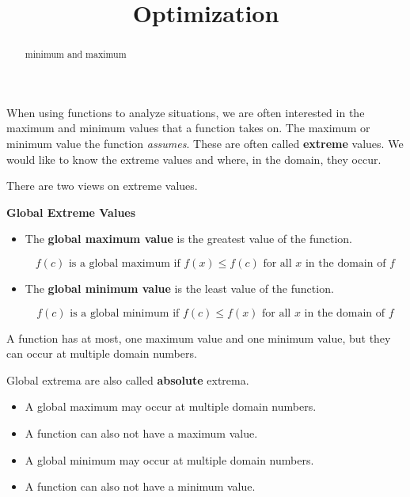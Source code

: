 \documentclass{ximera}
\title{Optimization}
\begin{document}
\begin{abstract}
minimum and maximum
\end{abstract}
\maketitle



When using functions to analyze situations, we are often interested in the maximum and minimum values that a function takes on. The maximum or minimum value the function \textit{assumes}. These are often called \textbf{extreme} values. We would like to know the extreme values and where, in the domain, they occur.



There are two views on extreme values.

\begin{definition} \textbf{\textcolor{green!50!black}{Global Extreme Values}} 

\begin{itemize}
\item The \textbf{global maximum value} is the greatest value of the function.  

\[  f(c) \text{ is a global maximum if } f(x) \leq f(c) \text{ for all } x \text{ in the domain of } f \]

\item The \textbf{global minimum value} is the least value of the function.  

\[  f(c) \text{ is a global minimum if } f(c) \leq f(x) \text{ for all } x \text{ in the domain of } f \]
\end{itemize}

A function has at most, one maximum value and one minimum value, but they can occur at multiple domain numbers.

Global extrema are also called \textbf{absolute} extrema.

\end{definition}




\begin{warning}

\begin{itemize}
\item A global maximum may occur at multiple domain numbers.  
\item A function can also not have a maximum value.
\end{itemize}

\begin{itemize}
\item A global minimum may occur at multiple domain numbers.  
\item A function can also not have a minimum value.
\end{itemize}

\end{warning}
\end{document}
